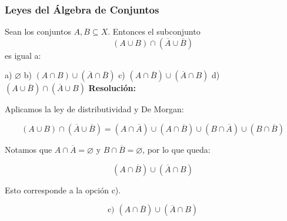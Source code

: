 \documentclass[a4paper,12pt]{article}
\begin{document}
\subsubsection{Leyes del Álgebra de Conjuntos}

\begin{ejercicio}[title=Ejercicio 6]
Sean los conjuntos $A,B\subseteq X$. Entonces el subconjunto 
\[
(A\cup B)\cap (\overline{A}\cup \overline{B})
\] 
es igual a: 

a) $\varnothing$ \quad b) $(A\cap B)\cup (\overline{A}\cap \overline{B})$ \quad 
c) $(A\cap \overline{B})\cup (\overline{A}\cap B)$ \quad 
d) $(A\cup \overline{B})\cap (\overline{A}\cup B)$
\tcblower
\textbf{Resolución:}

Aplicamos la ley de distributividad y De Morgan:

\[
(A\cup B)\cap (\overline{A}\cup \overline{B}) = (A\cap \overline{A}) \cup (A\cap \overline{B}) \cup (B\cap \overline{A}) \cup (B\cap \overline{B})
\]

Notamos que $A\cap \overline{A} = \varnothing$ y $B\cap \overline{B} = \varnothing$, por lo que queda:

\[
(A\cap \overline{B}) \cup (\overline{A}\cap B)
\]

Esto corresponde a la opción c).

\[
\boxed{\text{c) } (A\cap \overline{B}) \cup (\overline{A}\cap B)}
\]

\end{ejercicio}
\end{document}

